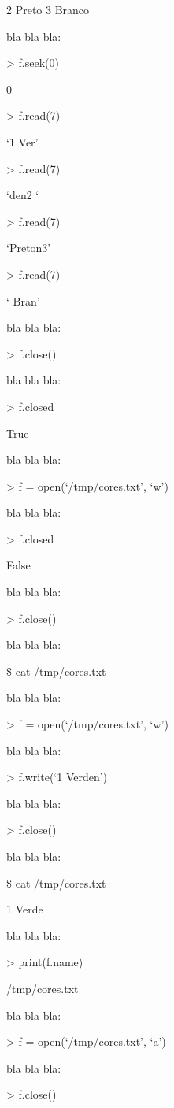 \documentclass[letterpaper,10pt,brazil]{sphinxmanual}
\begin{document}
2 \sphinxhyphen{} Preto
3 \sphinxhyphen{} Branco

bla bla bla:

\textgreater{} f.seek(0)

0

\textgreater{} f.read(7)

‘1 \sphinxhyphen{} Ver’

\textgreater{} f.read(7)

‘den2 \sphinxhyphen{} ‘

\textgreater{} f.read(7)

‘Preton3’

\textgreater{} f.read(7)

‘ \sphinxhyphen{} Bran’

bla bla bla:

\textgreater{} f.close()

bla bla bla:

\textgreater{} f.closed

True

bla bla bla:

\textgreater{} f = open(‘/tmp/cores.txt’, ‘w’)

bla bla bla:

\textgreater{} f.closed

False

bla bla bla:

\textgreater{} f.close()

bla bla bla:

\$ cat /tmp/cores.txt

bla bla bla:

\textgreater{} f = open(‘/tmp/cores.txt’, ‘w’)

bla bla bla:

\textgreater{} f.write(‘1 \sphinxhyphen{} Verden’)

bla bla bla:

\textgreater{} f.close()

bla bla bla:

\$ cat /tmp/cores.txt

1 \sphinxhyphen{} Verde

bla bla bla:

\textgreater{} print(f.name)

/tmp/cores.txt

bla bla bla:

\textgreater{} f = open(‘/tmp/cores.txt’, ‘a’)

bla bla bla:

\textgreater{} f.close()
\end{document}
